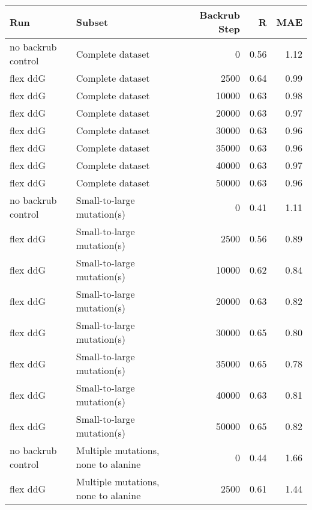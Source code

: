 \begin{table}
\begin{tabular}{llrrr}
\toprule
                Run &                               Subset &  Backrub Step &    R &  MAE \\
\midrule
 no backrub control &                     Complete dataset &             0 & 0.56 & 1.12 \\
           flex ddG &                     Complete dataset &          2500 & 0.64 & 0.99 \\
           flex ddG &                     Complete dataset &         10000 & 0.63 & 0.98 \\
           flex ddG &                     Complete dataset &         20000 & 0.63 & 0.97 \\
           flex ddG &                     Complete dataset &         30000 & 0.63 & 0.96 \\
           flex ddG &                     Complete dataset &         35000 & 0.63 & 0.96 \\
           flex ddG &                     Complete dataset &         40000 & 0.63 & 0.97 \\
           flex ddG &                     Complete dataset &         50000 & 0.63 & 0.96 \\
 no backrub control &           Small-to-large mutation(s) &             0 & 0.41 & 1.11 \\
           flex ddG &           Small-to-large mutation(s) &          2500 & 0.56 & 0.89 \\
           flex ddG &           Small-to-large mutation(s) &         10000 & 0.62 & 0.84 \\
           flex ddG &           Small-to-large mutation(s) &         20000 & 0.63 & 0.82 \\
           flex ddG &           Small-to-large mutation(s) &         30000 & 0.65 & 0.80 \\
           flex ddG &           Small-to-large mutation(s) &         35000 & 0.65 & 0.78 \\
           flex ddG &           Small-to-large mutation(s) &         40000 & 0.63 & 0.81 \\
           flex ddG &           Small-to-large mutation(s) &         50000 & 0.65 & 0.82 \\
 no backrub control &  Multiple mutations, none to alanine &             0 & 0.44 & 1.66 \\
           flex ddG &  Multiple mutations, none to alanine &          2500 & 0.61 & 1.44 \\

\end{tabular}
\end{table}
